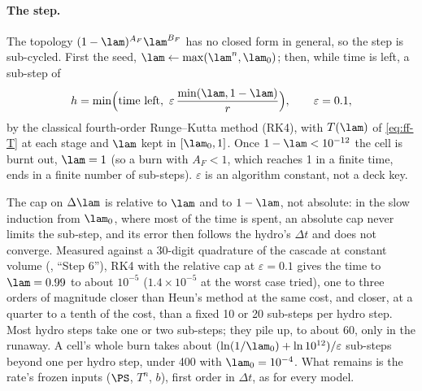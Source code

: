 \paragraph{The step.} The topology $(1 - \lam)^{A_F}\lam^{B_F}$ has no closed
form in general, so the step is sub-cycled. First the seed, $\lam \leftarrow
\max(\lam^n, \lam_0)$; then, while time is left, a sub-step of
\begin{equation}
  h = \min\Bigl(\text{time left},\ \varepsilon\,\frac{\min(\lam, 1 - \lam)}{r}\Bigr),
  \qquad \varepsilon = 0.1,
  \label{eq:ff-h}
\end{equation}
by the classical fourth-order Runge--Kutta method (RK4), with $T(\lam)$ of
\cref{eq:ff-T} at each stage and $\lam$ kept in $[\lam_0, 1]$. Once $1 -
\lam < 10^{-12}$ the cell is burnt out, $\lam = 1$ (so a burn with $A_F < 1$,
which reaches 1 in a finite time, ends in a finite number of sub-steps).
$\varepsilon$ is an algorithm constant, not a deck key.

The cap on $\Delta\lam$ is relative to $\lam$ and to $1 - \lam$, not absolute:
in the slow induction from $\lam_0$, where most of the time is spent, an
absolute cap never limits the sub-step, and its error then follows the hydro's
$\Delta t$ and does not converge. Measured against a 30-digit quadrature of
the cascade at constant volume (, ``Step 6''),
RK4 with the relative cap at $\varepsilon = 0.1$ gives the time to $\lam =
0.99$ to about $10^{-5}$ ($1.4\times10^{-5}$ at the worst case tried), one to
three orders of magnitude closer
than Heun's method at the same cost, and closer, at a quarter to a tenth of
the cost, than a fixed 10 or 20 sub-steps per hydro step. Most hydro steps
take one or two sub-steps; they pile up, to about 60, only in the runaway. A
cell's whole burn takes about $(\ln(1/\lam_0) + \ln 10^{12})/\varepsilon$
sub-steps beyond one per hydro step, under 400 with $\lam_0 = 10^{-4}$. What
remains is the rate's frozen inputs ($\PS$, $T^n$, $b$), first order in
$\Delta t$, as for every model.

